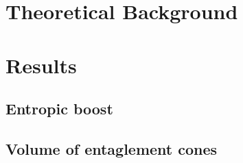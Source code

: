 \documentclass[a4paper, 11pt]{report}
\begin{document}
\renewcommand*{\familydefault}{lmss}
\renewcommand*{\rmdefault}{lmss}

\frontmatter






\renewcommand*{\familydefault}{lmr}
\renewcommand*{\rmdefault}{lmr}

%






\setcounter{tocdepth}{2}
\tableofcontents

\newpage
\mainmatter

\part{Theoretical Background}







\part{Results}

\chapter{Entropic boost}

\chapter{Volume of entaglement cones}








\backmatter




  
\end{document}
